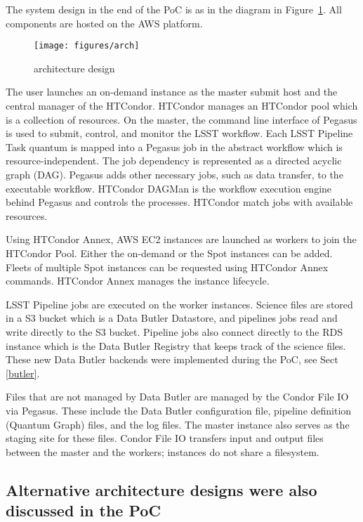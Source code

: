 The system design in the end of the PoC is as in the diagram in Figure~\ref{fig:arch}.
All components are hosted on the AWS platform.

\begin{figure}
  \centering
  \texttt{[image: figures/arch]}
  \label{fig:arch}
  \caption{architecture design}
\end{figure}

The user launches an on-demand instance as the master submit host and the central manager of the HTCondor.
HTCondor manages an HTCondor pool which is a collection of resources.
On the master, the command line interface of Pegasus is used to submit, control, and monitor the LSST workflow.
Each LSST Pipeline Task quantum is mapped into a Pegasus job in the abstract workflow which is resource-independent.
The job dependency is represented as a directed acyclic graph (DAG).
Pegasus adds other necessary jobs, such as data transfer, to the executable workflow.
HTCondor DAGMan is the workflow execution engine behind Pegasus and controls the processes.
HTCondor match jobs with available resources.

Using HTCondor Annex, AWS EC2 instances are launched as workers to join the HTCondor Pool.
Either the on-demand or the Spot instances can be added.
Fleets of multiple Spot instances can be requested using HTCondor Annex commands.
HTCondor Annex manages the instance lifecycle.

LSST Pipeline jobs are executed on the worker instances.
Science files are stored in a S3 bucket which is a Data Butler Datastore, and pipelines jobs read and write directly to the S3 bucket.
Pipeline jobs also connect directly to the RDS instance which is the Data Butler Registry that keeps track of the science files.
These new Data Butler backends were implemented during the PoC, see Sect \ref{butler}.

Files that are not managed by Data Butler are managed by the Condor File IO via Pegasus.
These include the Data Butler configuration file, pipeline definition (Quantum Graph) files, and the log files.
The master instance also serves as the staging site for these files.
Condor File IO transfers input and output files between the master and the workers; instances do not share a filesystem.


\subsection{Alternative architecture designs were also discussed in the PoC}

